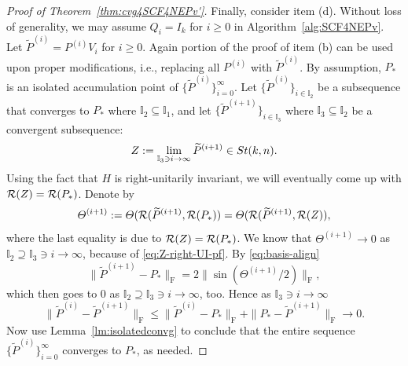 \documentclass[11pt]{article}
\def\bbI{\mathbb{I}}
\def\cR{{\cal R}}
\def\wtd{\widetilde}
\newcommand\STM[2]{{\rm St}(#1,#2)}
\DeclareMathOperator{\F}{F}
\theoremstyle{definition}
\numberwithin{equation}{section}
\begin{document}
\begin{proof}[Proof of Theorem~\ref{thm:cvg4SCF4NEPv'}]
Finally, consider item (d). Without loss of generality, we may assume $Q_i=I_k$ for $i\ge 0$ in Algorithm~\ref{alg:SCF4NEPv}.
Let $\wtd P^{(i)}=P^{(i)}V_i$ for $i\ge 0$. Again portion of the proof of item (b) can be used upon proper modifications, i.e.,
replacing all $P^{(i)}$ with $\wtd P^{(i)}$.
By assumption, $P_*$ is an isolated accumulation point of
$\{\wtd P^{(i)}\}_{i=0}^{\infty}$. Let $\{\wtd P^{(i)}\}_{i\in\bbI_2}$ be a subsequence
that converges to $P_*$ where $\bbI_2\subseteq\bbI_1$, and let $\{\wtd P^{(i+1)}\}_{i\in\bbI_3}$ where
$\bbI_3\subseteq \bbI_2$ be a convergent subsequence:
\begin{equation}\label{eq:Z-right-UI-pf}
Z:=\lim_{\bbI_3\ni i\to\infty}\wtd P^{(i+1)}\in \STM{k}{n}.
\end{equation}
Using the fact that $H$ is right-unitarily invariant, we will eventually come up with $\cR(Z)=\cR(P_*)$.
Denote by
$$
\Theta^{(i+1)}:=\Theta(\cR(\wtd P^{(i+1)},\cR(P_*))=\Theta(\cR(\wtd P^{(i+1)},\cR(Z)),
$$
where the last equality is due to $\cR(Z)=\cR(P_*)$. We know that $\Theta^{(i+1)}\to 0$ as $\bbI_2\supseteq\bbI_3\ni i\to\infty$,
because of \eqref{eq:Z-right-UI-pf}.
By \eqref{eq:basis-align}
$$
\|\wtd P^{(i+1)}-P_*\|_{\F}=2\|\sin(\Theta^{(i+1)}/2)\|_{\F},
$$
which then goes to $0$ as $\bbI_2\supseteq\bbI_3\ni i\to\infty$, too.
Hence as $\bbI_3\ni i\to\infty$
$$
\|\wtd P^{(i)}-\wtd P^{(i+1)}\|_{\F}\le\|\wtd P^{(i)}- P_*\|_{\F}+\| P_*-\wtd P^{(i+1)}\|_{\F}\to 0.
$$
Now use Lemma~\ref{lm:isolatedconvg} to conclude that the entire sequence
$\{\wtd P^{(i)}\}_{i=0}^{\infty}$ converges to $P_*$, as needed.
\end{proof}
\end{document}
